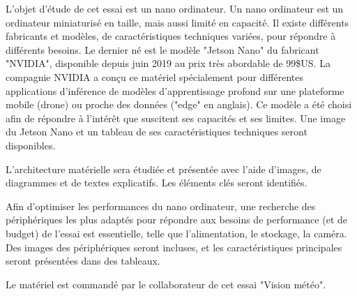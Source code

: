 ﻿\par L'objet d'étude de cet essai est un nano ordinateur. Un nano ordinateur est un ordinateur miniaturisé en taille, mais aussi limité en capacité. Il existe différents fabricants et modèles, de caractéristiques techniques variées, pour répondre à différents besoins. Le dernier né est le modèle "Jetson Nano" du fabricant "NVIDIA", disponible depuis juin 2019 au prix très abordable de 99\$US. La compagnie NVIDIA a conçu ce matériel spécialement pour différentes applications d'inférence de modèles d'apprentissage profond sur une plateforme mobile (drone) ou proche des données ("edge" en anglais). Ce modèle a été choisi afin de répondre à l'intérêt que suscitent ses capacités et ses limites. Une image du Jetson Nano et un tableau de ses caractéristiques techniques seront disponibles. 
\par L'architecture matérielle sera étudiée et présentée avec l'aide d'images, de diagrammes et de textes explicatifs. Les éléments clés seront identifiés.
\par Afin d'optimiser les performances du nano ordinateur, une recherche des périphériques les plus adaptés pour répondre aux besoins de performance (et de budget) de l'essai est essentielle, telle que l'alimentation, le stockage, la caméra. Des images des périphériques seront incluses, et les caractéristiques principales seront présentées dans des tableaux.
\par Le matériel est commandé par le collaborateur de cet essai "Vision météo".